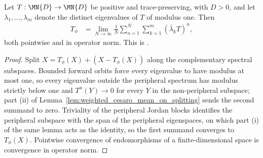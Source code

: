 \begin{theorem}
    \label{thm:peripheral_projection_weighted_cesaro}
    \leanok
    Let $T:\MN{D}\to\MN{D}$ be positive and trace-preserving, with $D>0$, and
    let $\lambda_{1},\dots,\lambda_{m}$ denote the distinct eigenvalues of
    $T$ of modulus one. Then
    \begin{align}
        T_\phi
         & =\lim_{N\to\infty}\frac{1}{N}\sum_{n=1}^{N}
        \sum_{k=1}^{m}(\bar\lambda_{k}T)^{n},
        \label{eq:peripheral_projection_weighted_cesaro}
    \end{align}
    both pointwise and in operator norm. This is
    \cite[Equation~(6.15)]{Wolf2012Quantum}.
\end{theorem}

\begin{proof}\leanok
    Split $X=T_\phi(X)+(X-T_\phi(X))$ along the complementary spectral
    subspaces. Bounded forward orbits force every eigenvalue to have modulus
    at most one, so every eigenvalue outside the peripheral spectrum has
    modulus strictly below one and $T^{n}(Y)\to0$ for every $Y$ in the
    non-peripheral
    subspace; part (ii) of
    Lemma~\ref{lem:weighted_cesaro_mean_on_splitting} sends the second
    summand to zero. Triviality of the peripheral Jordan blocks identifies
    the peripheral subspace with the span of the peripheral eigenspaces, on
    which part (i) of the same lemma acts as the identity, so the first
    summand converges to $T_\phi(X)$. Pointwise convergence of
    endomorphisms of a finite-dimensional space is convergence in operator
    norm.
\end{proof}
